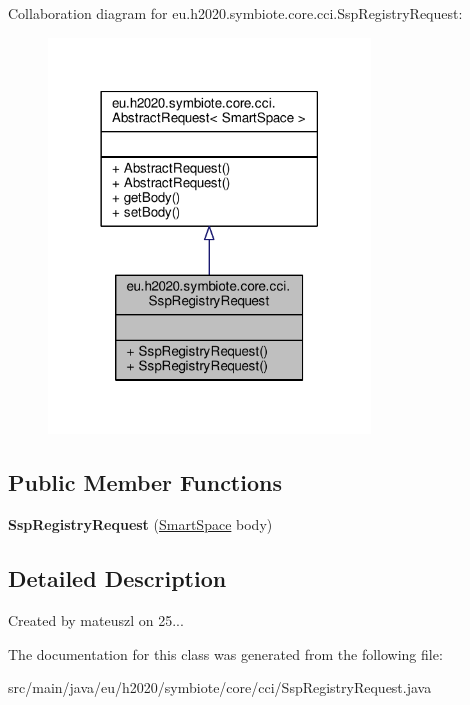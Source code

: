 Collaboration diagram for eu.\+h2020.\+symbiote.\+core.\+cci.\+Ssp\+Registry\+Request\+:
\nopagebreak
\begin{figure}[H]
\begin{center}
\leavevmode
\includegraphics[width=242pt]{classeu_1_1h2020_1_1symbiote_1_1core_1_1cci_1_1SspRegistryRequest__coll__graph}
\end{center}
\end{figure}
\subsection*{Public Member Functions}
\begin{DoxyCompactItemize}
\item 
\mbox{\label{classeu_1_1h2020_1_1symbiote_1_1core_1_1cci_1_1SspRegistryRequest_a2278828b8cb4a4e13772792ef3bf1c93}} 
{\bfseries Ssp\+Registry\+Request} (\hyperlink{classeu_1_1h2020_1_1symbiote_1_1model_1_1mim_1_1SmartSpace}{Smart\+Space} body)
\end{DoxyCompactItemize}


\subsection{Detailed Description}
Created by mateuszl on 25... 

The documentation for this class was generated from the following file\+:\begin{DoxyCompactItemize}
\item 
src/main/java/eu/h2020/symbiote/core/cci/Ssp\+Registry\+Request.\+java\end{DoxyCompactItemize}
